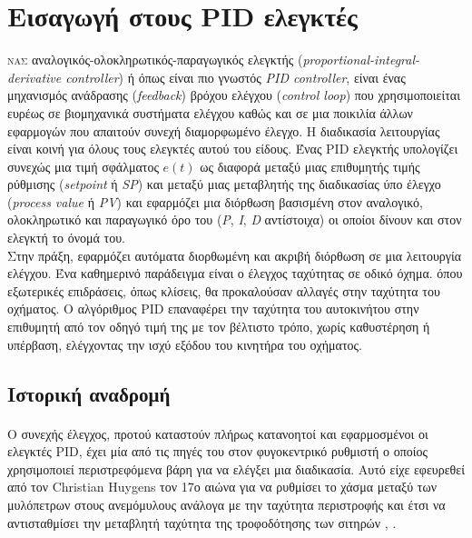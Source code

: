 


\section{Εισαγωγή στους PID ελεγκτές}

\lettrine[findent=2pt]{}{νας} αναλογικός-ολοκληρωτικός-παραγωγικός ελεγκτής (\emph{proportional-integral-derivative controller}) ή όπως είναι πιο γνωστός \emph{PID controller}, είναι ένας μηχανισμός ανάδρασης (\emph{feedback}) βρόχου ελέγχου (\emph{control loop}) που χρησιμοποιείται ευρέως σε βιομηχανικά συστήματα ελέγχου καθώς και σε μια ποικιλία άλλων εφαρμογών που απαιτούν συνεχή διαμορφωμένο έλεγχο. Η διαδικασία λειτουργίας είναι κοινή για όλους τους ελεγκτές αυτού του είδους. Ένας PID ελεγκτής υπολογίζει συνεχώς μια τιμή σφάλματος $e(t)$ ως διαφορά μεταξύ μιας επιθυμητής τιμής ρύθμισης (\emph{setpoint} ή \emph{SP}) και μεταξύ μιας μεταβλητής της διαδικασίας ύπο έλεγχο (\emph{process value} ή \emph{PV}) και εφαρμόζει μια διόρθωση βασισμένη στον αναλογικό, ολοκληρωτικό και παραγωγικό όρο του (\emph{P}, \emph{I}, \emph{D} αντίστοιχα) οι οποίοι δίνουν και στον ελεγκτή το όνομά του.\\
\linebreak
Στην πράξη, εφαρμόζει αυτόματα διορθωμένη και ακριβή διόρθωση σε μια λειτουργία ελέγχου. Ένα καθημερινό παράδειγμα είναι ο έλεγχος ταχύτητας σε οδικό όχημα. όπου εξωτερικές επιδράσεις, όπως κλίσεις, θα προκαλούσαν αλλαγές στην ταχύτητα του οχήματος. Ο αλγόριθμος PID επαναφέρει την ταχύτητα του αυτοκινήτου στην επιθυμητή από τον οδηγό τιμή της με τον βέλτιστο τρόπο, χωρίς καθυστέρηση ή υπέρβαση, ελέγχοντας την ισχύ εξόδου του κινητήρα του οχήματος.

\subsection{Ιστορική αναδρομή}

\paragraph{}Ο συνεχής έλεγχος, προτού καταστούν πλήρως κατανοητοί και εφαρμοσμένοι οι ελεγκτές PID, έχει μία από τις πηγές του στον φυγοκεντρικό ρυθμιστή ο οποίος χρησιμοποιεί περιστρεφόμενα βάρη για να ελέγξει μια διαδικασία. Αυτό είχε εφευρεθεί από τον Christian Huygens τον 17ο αιώνα για να ρυθμίσει το χάσμα μεταξύ των μυλόπετρων στους ανεμόμυλους ανάλογα με την ταχύτητα περιστροφής και έτσι να αντισταθμίσει την μεταβλητή ταχύτητα της τροφοδότησης των σιτηρών \cite{origin1}, \cite{origin2}.

